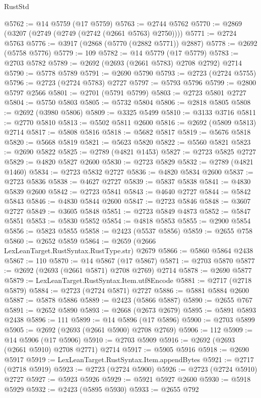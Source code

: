 \begin{lexlean}{RustStd}
\begin{coremodule}
@5762 := @14 @5759 (@17 @5759)
@5763 := @2744 @5762
@5770 := @2869 (@3207 (@2749 (@2749 (@2742 (@2661 @5763) @2750))))
@5771 := @2724 @5763
@5776 := @3917 (@2868 (@5770 (@2882 @5771)) @2887)
@5778 := @2692 (@5758 @5776)
@5779 := 109
@5782 := @14 @5779 (@17 @5779)
@5783 := @2703 @5782
@5789 := @2692 (@2693 (@2661 @5783) @2708 @2792) @2714
@5790 := @5778 @5789
@5791 := @2690 @5790
@5793 := @2723 (@2724 @5755)
@5796 := @2723 (@2724 @5783) @2727
@5797 := @5793 @5796
@5799 := @2800 @5797 @2566
@5801 := @2701 (@5791 @5799)
@5803 := @2723 @5801 @2727
@5804 := @5750 @5803
@5805 := @5732 @5804
@5806 := @2818 @5805
@5808 := @2692 (@3980 @5806)
@5809 := @3325 @5499
@5810 := @3133 @3716
@5811 := @2770 @5810
@5813 := @5502 @5811 @2600
@5816 := @2692 (@5809 @5813) @2714
@5817 := @5808 @5816
@5818 := @5682 @5817
@5819 := @5676 @5818
@5820 := @5668 @5819
@5821 := @5623 @5820
@5822 := @5560 @5821
@5823 := @2690 @5822
@5825 := @2789 (@4821 @1453)
@5827 := @2723 @5825 @2727
@5829 := @4820 @5827 @2600
@5830 := @2723 @5829
@5832 := @2789 (@4821 @1460)
@5834 := @2723 @5832 @2727
@5836 := @4820 @5834 @2600
@5837 := @2723 @5836
@5838 := @4627 @2727
@5839 := @5837 @5838
@5841 := @4830 @5839 @2600
@5842 := @2723 @5841
@5843 := @4640 @2727
@5844 := @5842 @5843
@5846 := @4830 @5844 @2600
@5847 := @2723 @5846
@5848 := @3607 @2727
@5849 := @3605 @5848
@5851 := @2723 @5849 @4873
@5852 := @5847 @5851
@5853 := @5830 @5852
@5854 := @4818 @5853
@5855 := @2900 @5854
@5856 := @5823 @5855
@5858 := @2423 (@5537 @5856)
@5859 := @2655 @758
@5860 := @2652 @5859
@5864 := @2659 (@2666 LexLeanTarget.RustSyntax.RustType.str) @2679
@5866 := @5860 @5864 @2438
@5867 := 110
@5870 := @14 @5867 (@17 @5867)
@5871 := @2703 @5870
@5877 := @2692 (@2693 (@2661 @5871) @2708 @2769) @2714
@5878 := @2690 @5877
@5879 := LexLeanTarget.RustSyntax.Item.utf8Encode
@5881 := @2717 (@2718 @5879)
@5884 := @2723 (@2724 @5871) @2727
@5886 := @5881 @5884 @2600
@5887 := @5878 @5886
@5889 := @2423 (@5866 @5887)
@5890 := @2655 @767
@5891 := @2652 @5890
@5893 := @2668 (@2673 @2679)
@5895 := @5891 @5893 @2438
@5896 := 111
@5899 := @14 @5896 (@17 @5896)
@5900 := @2703 @5899
@5905 := @2692 (@2693 (@2661 @5900) @2708 @2769)
@5906 := 112
@5909 := @14 @5906 (@17 @5906)
@5910 := @2703 @5909
@5916 := @2692 (@2693 (@2661 @5910) @2708 @2771) @2714
@5917 := @5905 @5916
@5918 := @2690 @5917
@5919 := LexLeanTarget.RustSyntax.Item.appendBytes
@5921 := @2717 (@2718 @5919)
@5923 := @2723 (@2724 @5900)
@5926 := @2723 (@2724 @5910) @2727
@5927 := @5923 @5926
@5929 := @5921 @5927 @2600
@5930 := @5918 @5929
@5932 := @2423 (@5895 @5930)
@5933 := @2655 @792

\end{coremodule}
\end{lexlean}
